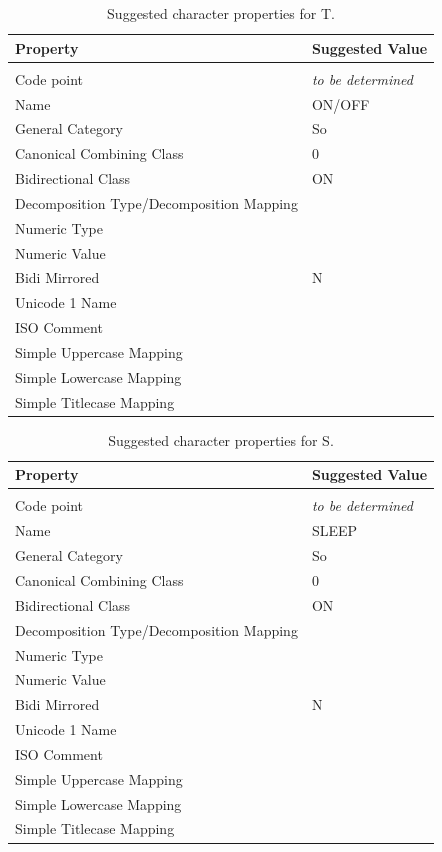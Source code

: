 \documentclass[10pt,a4paper]{article}
\newcommand{\IEC}[1]{{\fontspec{IECpower}#1}}
\begin{document}
\begin{table}[htbp]
	\centering
	\begin{tabular}{ll}
		\textbf{Property} & \textbf{Suggested Value} \\
		\hline \\
		Code point                & \emph{to be determined} \\
		Name                      & ON/OFF \\
		General Category          & So \\
		Canonical Combining Class & 0 \\
		Bidirectional Class       & ON \\
		Decomposition Type/Decomposition Mapping \\
		Numeric Type \\
		Numeric Value \\
		Bidi Mirrored             & N \\
		Unicode 1 Name \\
		ISO Comment \\
		Simple Uppercase Mapping \\
		Simple Lowercase Mapping \\
		Simple Titlecase Mapping \\
    \end{tabular}
    \caption{Suggested character properties for \IEC{T}.}
    \label{table:character-properties-T} %
\end{table}

\begin{table}[htbp]
	\centering
	\begin{tabular}{ll}
		\textbf{Property} & \textbf{Suggested Value} \\
		\hline \\
		Code point                & \emph{to be determined} \\
		Name                      & SLEEP \\
		General Category          & So \\
		Canonical Combining Class & 0 \\
		Bidirectional Class       & ON \\
		Decomposition Type/Decomposition Mapping \\
		Numeric Type \\
		Numeric Value \\
		Bidi Mirrored             & N \\
		Unicode 1 Name \\
		ISO Comment \\
		Simple Uppercase Mapping \\
		Simple Lowercase Mapping \\
		Simple Titlecase Mapping \\
    \end{tabular}
    \caption{Suggested character properties for \IEC{S}.}
    \label{table:character-properties-S} %
\end{table}
\end{document}
